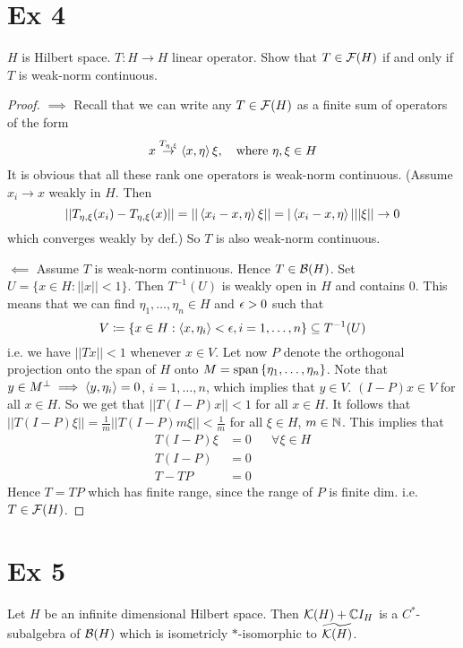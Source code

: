 \documentclass[10pt,english,a4paper]{article}
\theoremstyle{definition}
\begin{document}
\section*{Ex 4}
$H$ is Hilbert space. $T\colon H \to H$ linear operator. Show that 
$T \in \mathcal{F}(H)$ if and only if $T$ is weak-norm continuous. 

\begin{proof}
    $\implies$ Recall that we can write any $T \in \mathcal{F}(H)$ as a finite sum of 
    operators of the form 
    \[ x \overset{T_{\eta,\xi}}{\to} \left\langle x,\eta \right\rangle\xi, \quad \text{where }\eta,\xi \in H\]
   It is obvious that all these rank one operators is weak-norm continuous.
    (Assume $x_i \to x$ weakly in $H$. Then 
    \[||T_{\eta,\xi}(x_i) - T_{\eta,\xi}(x)|| = ||\left\langle x_i-x,\eta \right\rangle\xi|| 
    = |\left\langle x_i-x,\eta \right\rangle|||\xi|| \to 0\]
which converges weakly by def.)  So $T$ is also weak-norm continuous.


$\impliedby$ Assume $T$ is weak-norm continuous. Hence $T \in \mathcal{B}(H)$. Set 
$U = \{ x \in H : ||x|| < 1 \}$. Then $T^{-1}(U)$ is weakly open in $H$
and contains $0$. This means that we can find $\eta_1,\ldots, \eta_n \in H$ 
and $\epsilon > 0$ such that 
\[ V \coloneqq \{ x \in H : \left\langle x,\eta_i \right\rangle < \epsilon, i =1, \ldots, n \}  \subseteq T^{-1}(U)\]
i.e. we have $||Tx|| < 1$ whenever $x \in V$. Let now $P$ denote the orthogonal 
projection onto the span of $H$ onto $M = \text{span} \left\{\eta_1, \ldots,\eta_n\right\}$. 
Note that $y \in M^{\perp} \implies \left\langle y,\eta_i \right\rangle = 0$, $i=1,\ldots, n$,
which implies that $y \in V$. $(I-P)x \in V$ for all $x \in H$. So we get that
$||T(I-P)x|| < 1$ for all $x \in H$. It follows that 
$||T(I-P)\xi|| = \tfrac{1}{m}||T(I-P)m\xi||< \tfrac{1}{m}$ for all $\xi \in H$,
$m \in \mathbb{N}$. This implies that 
\begin{align*}
    T(I-P)\xi &= 0&&\forall \xi \in H \\  
    T(I-P) &= 0 \\
    T-TP &= 0
\end{align*}
Hence $T = TP$ which has finite range, since the range of $P$ is finite dim. i.e.
$T \in \mathcal{F}(H)$.


\end{proof}



\section*{Ex 5}
Let $H$ be an infinite dimensional Hilbert space. Then $\mathcal{K}(H) + \mathbb{C} I_{H}$ is a 
$C^*$-subalgebra of $\mathcal{B}(H)$ which is isometricly $*$-isomorphic to
$\widetilde{\mathcal{K}(H)}$. 
\end{document}
